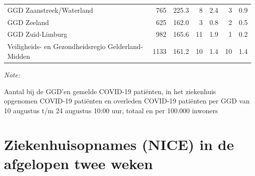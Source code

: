 \documentclass[
  english,
  man,floatsintext]{apa6}
\begin{document}
\begin{table}
\begin{threeparttable}
\begin{tabular}{lrrrrrr}
GGD Zaanstreek/Waterland & 765 & 225.3 & 8 & 2.4 & 3 & 0.9\\
GGD Zeeland & 625 & 162.0 & 3 & 0.8 & 2 & 0.5\\
GGD Zuid-Limburg & 982 & 165.6 & 11 & 1.9 & 1 & 0.2\\
Veiligheids- en Gezondheidsregio Gelderland-Midden & 1133 & 161.2 & 10 & 1.4 & 10 & 1.4\\
\bottomrule
\end{tabular}
\begin{tablenotes}
\item \textit{Note: } 
\item Aantal bij de GGD’en gemelde COVID-19 patiënten, in het ziekenhuis opgenomen COVID-19 patiënten en overleden COVID-19 patiënten per GGD van 10 augustus t/m 24 augustus 10:00 uur, totaal en per 100.000 inwoners
\end{tablenotes}
\end{threeparttable}
\endgroup{}
\end{table}

\newpage

\hypertarget{ziekenhuisopnames-nice-in-de-afgelopen-twee-weken}{%
\section{Ziekenhuisopnames (NICE) in de afgelopen twee weken}\label{ziekenhuisopnames-nice-in-de-afgelopen-twee-weken}}
\end{document}
